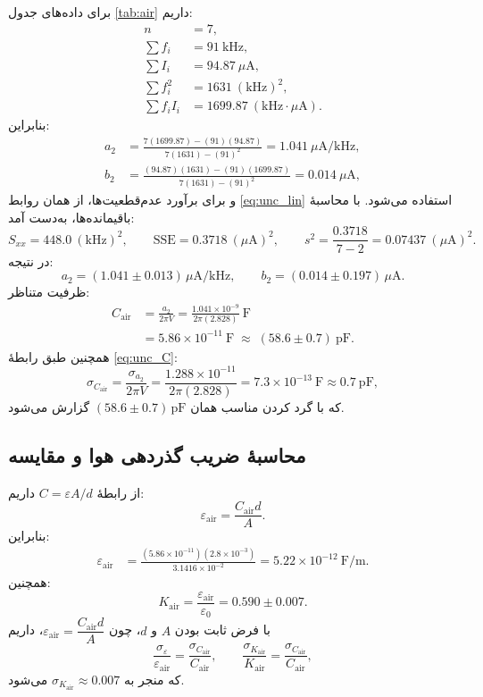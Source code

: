 \documentclass[a4paper, 11pt]{article}
\begin{document}
برای داده‌های جدول \ref{tab:air} داریم:
\begin{align}
n &= 7,\\
\sum f_i &= 91~\mathrm{kHz},\\
\sum I_i &= 94.87~\mu\mathrm{A},\\
\sum f_i^2 &= 1631~(\mathrm{kHz})^2,\\
\sum f_i I_i &= 1699.87~(\mathrm{kHz}\cdot \mu\mathrm{A}).
\end{align}
بنابراین:
\begin{align}
a_2 &= \frac{7(1699.87)- (91)(94.87)}{7(1631)-(91)^2}
= 1.041~\mu\mathrm{A/kHz},\\
b_2 &= \frac{(94.87)(1631)-(91)(1699.87)}{7(1631)-(91)^2}
=0.014~\mu\mathrm{A},
\end{align}
و برای برآورد عدم‌قطعیت‌ها، از همان روابط \eqref{eq:unc_lin} استفاده می‌شود. با محاسبهٔ باقیمانده‌ها، به‌دست آمد:
\[
S_{xx}=448.0~(\mathrm{kHz})^2,\qquad
\mathrm{SSE}=0.3718~(\mu\mathrm{A})^2,\qquad
s^2=\frac{0.3718}{7-2}=0.07437~(\mu\mathrm{A})^2.
\]
در نتیجه:
\[
a_2=(1.041\pm 0.013)\,\mu\mathrm{A/kHz},
\qquad
b_2=(0.014\pm 0.197)\,\mu\mathrm{A}.
\]
ظرفیت متناظر:
\begin{align}
C_{\mathrm{air}} &= \frac{a_2}{2\pi V}
= \frac{1.041\times 10^{-9}}{2\pi(2.828)} \ \mathrm{F} \nonumber\\
&= 5.86\times 10^{-11}\ \mathrm{F}
\;\approx\; (58.6\pm 0.7)\ \mathrm{pF}.
\end{align}
همچنین طبق رابطهٔ \eqref{eq:unc_C}:
\[
\sigma_{C_{\mathrm{air}}}=\frac{\sigma_{a_2}}{2\pi V}
=\frac{1.288\times 10^{-11}}{2\pi(2.828)}=7.3\times 10^{-13}\ \mathrm{F}\approx 0.7~\mathrm{pF},
\]
که با گرد کردن مناسب همان \((58.6\pm 0.7)\,\mathrm{pF}\) گزارش می‌شود.



\subsection*{محاسبهٔ ضریب گذردهی هوا و مقایسه}

از رابطهٔ $C=\varepsilon A/d$ داریم:
\[
\varepsilon_{\mathrm{air}}=\frac{C_{\mathrm{air}}d}{A}.
\]
بنابراین:
\begin{align}
\varepsilon_{\mathrm{air}} &=
\frac{(5.86\times 10^{-11})(2.8\times 10^{-3})}{3.1416\times 10^{-2}}
=5.22\times 10^{-12}\ \mathrm{F/m}.
\end{align}
همچنین:
\[
K_{\mathrm{air}}=\frac{\varepsilon_{\mathrm{air}}}{\varepsilon_0}
=0.590\pm 0.007.
\]
با فرض ثابت بودن \(A\) و \(d\)، چون \(\varepsilon_{\mathrm{air}}=\dfrac{C_{\mathrm{air}}d}{A}\)، داریم
\[
\frac{\sigma_{\varepsilon}}{\varepsilon_{\mathrm{air}}}=\frac{\sigma_{C_{\mathrm{air}}}}{C_{\mathrm{air}}},
\qquad
\frac{\sigma_{K_{\mathrm{air}}}}{K_{\mathrm{air}}}=\frac{\sigma_{C_{\mathrm{air}}}}{C_{\mathrm{air}}},
\]
که منجر به \(\sigma_{K_{\mathrm{air}}}\approx 0.007\) می‌شود.
\end{document}
